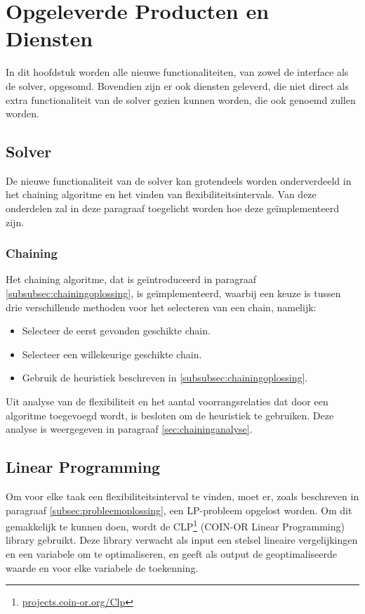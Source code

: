 \section{Opgeleverde Producten en Diensten}

In dit hoofdstuk worden alle nieuwe functionaliteiten, van zowel de interface als de solver, opgesomd. Bovendien zijn er ook diensten geleverd, die niet direct als extra functionaliteit van de solver gezien kunnen worden, die ook genoemd zullen worden.

\subsection{Solver}
De nieuwe functionaliteit van de solver kan grotendeels worden onderverdeeld in het chaining algoritme en het vinden van flexibiliteitsintervals. Van deze onderdelen zal in deze paragraaf toegelicht worden hoe deze ge\"implementeerd zijn.

\subsubsection*{Chaining}
Het chaining algoritme, dat is ge\"introduceerd in paragraaf \ref{subsubsec:chainingoplossing}, is ge\"implementeerd, waarbij een keuze is tussen drie verschillende methoden voor het selecteren van een chain, namelijk:
\begin{itemize}
\item Selecteer de eerst gevonden geschikte chain.
\item Selecteer een willekeurige geschikte chain.
\item Gebruik de heuristiek beschreven in \ref{subsubsec:chainingoplossing}.
\end{itemize}

Uit analyse van de flexibiliteit en het aantal voorrangsrelaties dat door een algoritme toegevoegd wordt, is besloten om de heuristiek te gebruiken. Deze analyse is weergegeven in paragraaf \ref{sec:chaininganalyse}.

\subsection*{Linear Programming}
Om voor elke taak een flexibiliteitsinterval te vinden, moet er, zoals beschreven in paragraaf \ref{subsec:probleemoplossing}, een LP-probleem opgelost worden. Om dit gemakkelijk te kunnen doen, wordt de CLP\footnote{\href{https://projects.coin-or.org/Clp}{projects.coin-or.org/Clp}} (COIN-OR Linear Programming) library gebruikt. Deze library verwacht als input een stelsel lineaire vergelijkingen en een variabele om te optimaliseren, en geeft als output de geoptimaliseerde waarde en voor elke variabele de toekenning.

